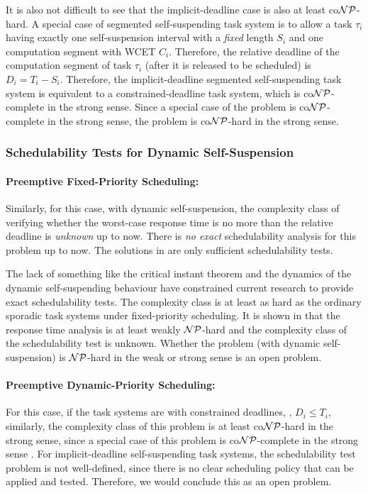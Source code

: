 It is also not difficult to see that the implicit-deadline case is also at least co${\cal NP}$-hard.  A special case of segmented self-suspending task system is to allow a task $\tau_i$ having exactly one self-suspension interval with a \emph{fixed} length $S_i$ and one computation segment with WCET $C_i$. Therefore, the relative deadline of the computation segment of task $\tau_i$ (after it is released to be scheduled) is $D_i = T_i-S_i$. Therefore, the implicit-deadline segmented self-suspending task system is equivalent to a constrained-deadline task system, which is co${\cal NP}$-complete in the strong sense. Since a special case of the problem is co${\cal NP}$-complete in the strong sense, the problem is co${\cal NP}$-hard in the strong sense.


\subsubsection{Schedulability Tests for Dynamic Self-Suspension}
\paragraph{Preemptive Fixed-Priority Scheduling:}   

Similarly, for this case, with dynamic self-suspension, the complexity class of verifying whether the worst-case response time is no more than the relative deadline is \emph{unknown} up to now. There is \emph{no exact} schedulability analysis for this problem up to now. The solutions in \cite{Liu:2000:RS:518501,LiuChen:rtss2014,huangpass:dac2015} are only sufficient schedulability tests. 

The lack of something like the critical instant theorem and the dynamics of the dynamic self-suspending behaviour have constrained current research to provide exact schedulability tests. The complexity class is at least as hard as the ordinary sporadic task systems under fixed-priority scheduling. It is shown in \cite{EisenbrandR08} that the response time analysis is at least weakly ${\cal NP}$-hard and the complexity class of the schedulability test is unknown. Whether the problem (with dynamic self-suspension) is ${\cal NP}$-hard in the weak or strong sense is an open problem.

\paragraph{Preemptive Dynamic-Priority Scheduling:} 
For this case, if the task systems are with constrained deadlines, \ie, $D_i \leq T_i$, similarly, the complexity class of this problem is at least co${\cal NP}$-hard in the strong sense, since a special case of this problem is co${\cal NP}$-complete in the strong sense \cite{DBLP:conf/ecrts/Ekberg015}. For implicit-deadline self-suspending task systems, the schedulability test problem is not well-defined, since there is no clear scheduling policy that can be applied and tested. Therefore, we would conclude this as an open problem.





  
